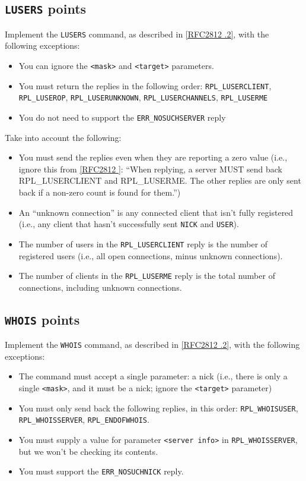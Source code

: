 \documentclass[10pt]{article}
\newcommand{\RFCsection}[2]{\href{http://tools.ietf.org/html/rfc#1\#section-#2}{[RFC#1 \textsection #2]}}
\newcommand{\points}[1]{{\sffamily\mdseries\guillemotleft #1 points\guillemotright{}}}
\begin{document}
\subsection{\texttt{LUSERS} \points{10}}

Implement the \texttt{LUSERS} command, as described in \RFCsection{2812}{3.4.2}, with the following exceptions:

\begin{itemize}
\item You can ignore the \texttt{<mask>} and \texttt{<target>} parameters.
\item You must return the replies in the following order: \texttt{RPL\_LUSERCLIENT}, \texttt{RPL\_LUSEROP}, \texttt{RPL\_LUSERUNKNOWN}, \texttt{RPL\_LUSERCHANNELS}, \texttt{RPL\_LUSERME}
\item You do not need to support the \texttt{ERR\_NOSUCHSERVER} reply
\end{itemize}

\noindent Take into account the following:

\begin{itemize}
\item You must send the replies even when they are reporting a zero value (i.e., ignore this from \RFCsection{2812}{5.1}: ``When replying, a server MUST send back RPL\_LUSERCLIENT and RPL\_LUSERME. The other replies are only sent back if a non-zero count is found for them.'') 
\item An ``unknown connection'' is any connected client that isn't fully registered (i.e., any client that hasn't successfully sent \texttt{NICK} and \texttt{USER}).
\item The number of users in the \texttt{RPL\_LUSERCLIENT} reply is the number of registered users (i.e., all open connections, minus unknown connections).
\item The number of clients in the \texttt{RPL\_LUSERME} reply is the total number of connections, including unknown connections.
\end{itemize}

\subsection{\texttt{WHOIS} \points{10}}

Implement the \texttt{WHOIS} command, as described in \RFCsection{2812}{3.6.2}, with the following exceptions:

\begin{itemize}
\item The command must accept a single parameter: a nick (i.e., there is only a single \texttt{<mask>}, and it must be a nick; ignore the \texttt{<target>} parameter)
\item You must only send back the following replies, in this order: \texttt{RPL\_WHOISUSER}, \texttt{RPL\_WHOISSERVER}, \texttt{RPL\_ENDOFWHOIS}. 
\item You must supply a value for parameter \texttt{<server info>} in \texttt{RPL\_WHOISSERVER}, but we won't be checking its contents.
\item You must support the \texttt{ERR\_NOSUCHNICK} reply.
\end{itemize}
\end{document}
